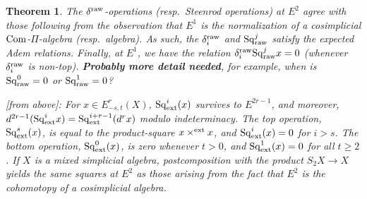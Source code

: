 \documentclass[11pt]{amsart}
\theoremstyle{plain}
\newtheorem{thm}{Theorem}[section]
\theoremstyle{definition}
\renewcommand{\to}{\longrightarrow}
\theoremstyle{plain}
\newcommand{\Sq}{\mathrm{Sq}}
\begin{document}
\begin{second quadrant homotopy}
\begin{thm}
The $\delta^\textup{raw}$-operations (resp.\ Steenrod operations)  at $E^2$ agree with those following from the observation that $E^1$ is the normalization of a cosimplicial $\textup{Com}$-$\Pi$-algebra (resp.\ algebra). As such, the $\delta_i^\textup{raw}$ and $\Sq^j_\textup{raw}$ satisfy the expected Adem relations. Finally, at $E^1$, we have the relation $\delta_i^\textup{raw}\Sq^j_\textup{raw}x=0$ (whenever $\delta_i^\textup{raw}$ is non-top). \textbf{Probably more detail needed}, for example, when is $\Sq_\textup{raw}^0=0$ or $\Sq_\textup{raw}^1=0$?

[from above]: For $x\in E^r_{-s,t}(X)$, $\Sq^i_\textup{ext}(x)$ survives to $E^{2r-1}$, and moreover, $d^{2r-1}(\Sq^i_\textup{ext}x)=\Sq^{i+r-1}_\textup{ext}(d^rx)$ modulo indeterminacy. The top operation, $\Sq^s_\textup{ext}(x)$, is equal to the product-square $x\times^\textup{ext} x$, and $\Sq^i_\textup{ext}(x)=0$ for $i>s$. The bottom operation, $\Sq^0_\textup{ext}(x)$, is zero whenever $t>0$, and $\Sq^1_\textup{ext}(x)=0$ for all $t\geq2$. If $X$ is a mixed simplicial algebra, postcomposition with the product $S_2X\to X$ yields the same squares at $E^2$ as those arising from the fact that $E^2$ is the cohomotopy of a cosimplicial algebra.
\end{thm}

\end{second quadrant homotopy}
\end{document}
